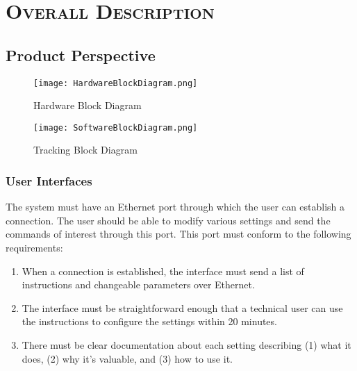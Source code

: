 \documentclass[ProjectRequirements.tex]{subfiles}
\begin{document}
\bigskip

\section{\textsc{\Large Overall Description}}
	\subsection{Product Perspective}
	\begin{figure}[H]
		\centering
		\texttt{[image: HardwareBlockDiagram.png]}
		\caption{Hardware Block Diagram \label{fig:HardwareBlockDiagram}}
	\end{figure}
	\begin{figure}[H]
		\centering
		\texttt{[image: SoftwareBlockDiagram.png]}
		\caption{Tracking Block Diagram \label{fig:SoftwareBlockDiagram}}
	\end{figure}
			
		\subsubsection{User Interfaces}
			The system must have an Ethernet port through which the user can establish a connection. The user should be able to modify various settings and send the commands of interest through this port. This port must conform to the following requirements:
			\begin{enumerate}
				\item When a connection is established, the interface must send a list of instructions and changeable parameters over Ethernet.
				\item The interface must be straightforward enough that a technical user can use the instructions to configure the settings within 20 minutes.
				\item There must be clear documentation about each setting describing (1) what it does, (2) why it's valuable, and (3) how to use it.
			\end{enumerate}	
			
\end{document}
